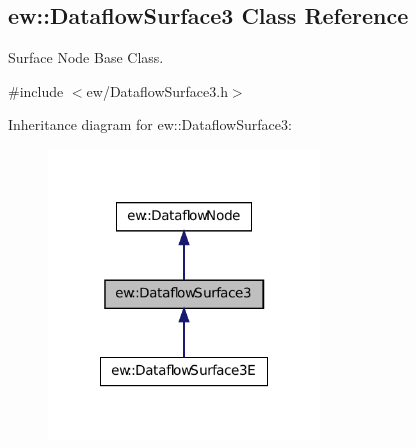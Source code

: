 \hypertarget{classew_1_1DataflowSurface3}{
\subsection{ew::DataflowSurface3 Class Reference}
\label{classew_1_1DataflowSurface3}
}


Surface Node Base Class.  




{\ttfamily \#include $<$ew/DataflowSurface3.h$>$}



Inheritance diagram for ew::DataflowSurface3:
\nopagebreak
\begin{figure}[H]
\begin{center}
\leavevmode
\includegraphics[width=204pt]{classew_1_1DataflowSurface3__inherit__graph}
\end{center}
\end{figure}
